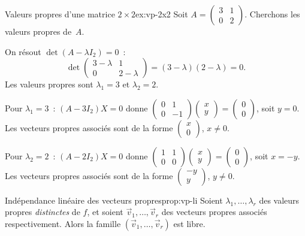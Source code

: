 \begin{example}{Valeurs propres d'une matrice $2\times 2$}{ex:vp-2x2}
  Soit $A=\begin{pmatrix}3&1\\0&2\end{pmatrix}$. Cherchons les valeurs
  propres de~$A$.

  On résout $\det(A-\lambda I_2)=0$~:
  \[
    \det\begin{pmatrix}3-\lambda&1\\0&2-\lambda\end{pmatrix}
    =(3-\lambda)(2-\lambda)=0.
  \]
  Les valeurs propres sont $\lambda_1=3$ et $\lambda_2=2$.

  Pour $\lambda_1=3$~: $(A-3I_2)X=0$ donne
  $\begin{pmatrix}0&1\\0&-1\end{pmatrix}\begin{pmatrix}x\\y\end{pmatrix}
  =\begin{pmatrix}0\\0\end{pmatrix}$, soit $y=0$. Les vecteurs propres
  associés sont de la forme $\begin{pmatrix}x\\0\end{pmatrix}$, $x\neq 0$.

  Pour $\lambda_2=2$~: $(A-2I_2)X=0$ donne
  $\begin{pmatrix}1&1\\0&0\end{pmatrix}\begin{pmatrix}x\\y\end{pmatrix}
  =\begin{pmatrix}0\\0\end{pmatrix}$, soit $x=-y$. Les vecteurs propres
  associés sont de la forme $\begin{pmatrix}-y\\y\end{pmatrix}$, $y\neq 0$.
\end{example}

\begin{proposition}{Indépendance linéaire des vecteurs propres}{prop:vp-li}
  Soient $\lambda_1,\ldots,\lambda_r$ des valeurs propres
  \emph{distinctes} de $f$, et soient $\vec{v}_1,\ldots,\vec{v}_r$ des
  vecteurs propres associés respectivement. Alors la famille
  $(\vec{v}_1,\ldots,\vec{v}_r)$ est libre.
\end{proposition}

